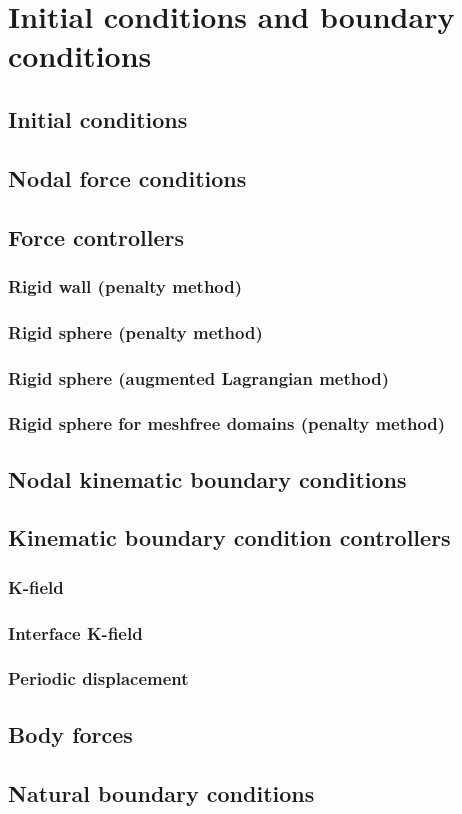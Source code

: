 
\section{Initial conditions and boundary conditions}
\label{set.ICandBC}
\subsection{Initial conditions}
\subsection{Nodal force conditions}
\subsection{Force controllers}

\subsubsection{Rigid wall (penalty method)}
\subsubsection{Rigid sphere (penalty method)}
\subsubsection{Rigid sphere (augmented Lagrangian method)}
\subsubsection{Rigid sphere for meshfree domains (penalty method)}
\subsection{Nodal kinematic boundary conditions}
\subsection{Kinematic boundary condition controllers}
\subsubsection{K-field}
\subsubsection{Interface K-field}
\subsubsection{Periodic displacement}
\subsection{Body forces}
\subsection{Natural boundary conditions}